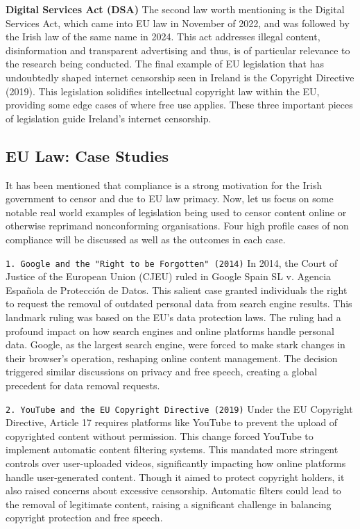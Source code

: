\textbf{Digital Services Act (DSA)}
The second law worth mentioning is the Digital Services Act, which came into EU law in November of 2022, and was followed by the Irish law of the same name in 2024. \cite{enterprisegovie2025} \cite{irishstatutebook2024} This act addresses illegal content, disinformation and transparent advertising and thus, is of particular relevance to the research being conducted. 
The final example of EU legislation that has undoubtedly shaped internet censorship seen in Ireland is the Copyright Directive (2019). This legislation solidifies intellectual copyright law within the EU, providing some edge cases of where free use applies. \cite{EUCopyright} These three important pieces of legislation guide Ireland's internet censorship. 

\subsection{EU Law: Case Studies}
It has been mentioned that compliance is a strong motivation for the Irish government to censor and due to EU law primacy. Now, let us focus on some notable real world examples of legislation being used to censor content online or otherwise reprimand nonconforming organisations. Four high profile cases of non compliance will be discussed as well as the outcomes in each case. 

\texttt{1. Google and the "Right to be Forgotten" (2014)}
In 2014, the Court of Justice of the European Union (CJEU) ruled in Google Spain SL v. Agencia Española de Protección de Datos. This salient case granted individuals the right to request the removal of outdated personal data from search engine results. \cite{google2014} This landmark ruling was based on the EU's data protection laws. The ruling had a profound impact on how search engines and online platforms handle personal data. Google, as the largest search engine, were forced to make stark changes in their browser's operation, reshaping online content management. The decision triggered similar discussions on privacy and free speech, creating a global precedent for data removal requests.

\texttt{2. YouTube and the EU Copyright Directive (2019)}
Under the EU Copyright Directive, Article 17 requires platforms like YouTube to prevent the upload of copyrighted content without permission. \cite{eu2019} This change forced YouTube to implement automatic content filtering systems. This mandated more stringent controls over user-uploaded videos, significantly impacting how online platforms handle user-generated content. Though it aimed to protect copyright holders, it also raised concerns about excessive censorship. Automatic filters could lead to the removal of legitimate content, raising a significant challenge in balancing copyright protection and free speech.


